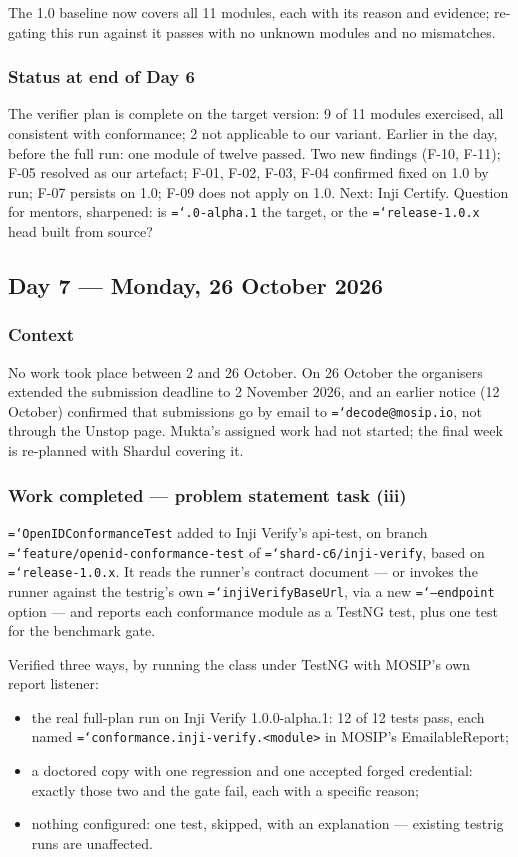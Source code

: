 \documentclass[11pt,a4paper]{article}
\newcommand{\tightlist}{\setlength{\itemsep}{0pt}\setlength{\parskip}{0pt}\setlength{\parsep}{0pt}}
\let\origtexttt\texttt
\renewcommand{\texttt}[1]{\origtexttt{\hyphenchar\font=`\-\relax #1}}
\renewcommand{\_}{\textunderscore\allowbreak}
\begin{document}
The 1.0 baseline now covers all 11 modules, each with its reason and evidence; re-gating this
run against it passes with no unknown modules and no mismatches.

\subsubsection*{Status at end of Day 6}
The verifier plan is complete on the target version: 9 of 11 modules exercised, all
consistent with conformance; 2 not applicable to our variant. Earlier in the day, before the
full run: one module of twelve passed. Two new findings (F-10, F-11); F-05
resolved as our artefact; F-01, F-02, F-03, F-04 confirmed fixed on 1.0 by run; F-07
persists on 1.0; F-09 does not apply on 1.0. Next: Inji Certify. Question for mentors, sharpened: is \texttt{1.0.0-alpha.1} the target,
or the \texttt{release-1.0.x} head built from source?

\subsection{Day 7 --- Monday, 26 October 2026}

\subsubsection*{Context}
No work took place between 2 and 26 October. On 26 October the organisers extended the
submission deadline to 2 November 2026, and an earlier notice (12 October) confirmed that
submissions go by email to \texttt{decode@mosip.io}, not through the Unstop page. Mukta's
assigned work had not started; the final week is re-planned with Shardul covering it.

\subsubsection*{Work completed --- problem statement task (iii)}
\texttt{OpenIDConformanceTest} added to Inji Verify's api-test, on branch
\texttt{feature/openid-conformance-test} of \texttt{shard-c6/inji-verify}, based on
\texttt{release-1.0.x}. It reads the runner's contract document --- or invokes the runner against
the testrig's own \texttt{injiVerifyBaseUrl}, via a new \texttt{--endpoint} option --- and reports
each conformance module as a TestNG test, plus one test for the benchmark gate.

Verified three ways, by running the class under TestNG with MOSIP's own report listener:
\begin{itemize}\tightlist
  \item the real full-plan run on Inji Verify 1.0.0-alpha.1: 12 of 12 tests pass, each named
        \texttt{conformance.inji-verify.<module>} in MOSIP's EmailableReport;
  \item a doctored copy with one regression and one accepted forged credential: exactly those
        two and the gate fail, each with a specific reason;
  \item nothing configured: one test, skipped, with an explanation --- existing testrig runs
        are unaffected.
\end{itemize}
\end{document}
